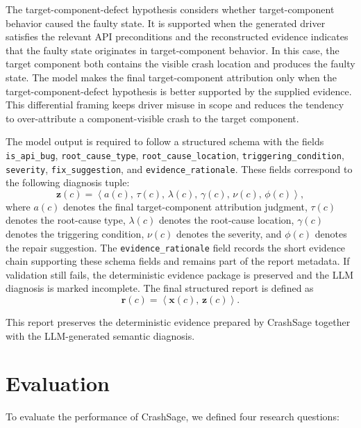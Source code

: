 \documentclass[pdflatex,sn-basic]{sn-jnl}%
\theoremstyle{thmstyleone}%
\theoremstyle{thmstyletwo}%
\theoremstyle{thmstylethree}%
\begin{document}
The target-component-defect hypothesis considers whether target-component behavior caused the faulty state. It is supported when the generated driver satisfies the relevant API preconditions and the reconstructed evidence indicates that the faulty state originates in target-component behavior. In this case, the target component both contains the visible crash location and produces the faulty state. The model makes the final target-component attribution only when the target-component-defect hypothesis is better supported by the supplied evidence. This differential framing keeps driver misuse in scope and reduces the tendency to over-attribute a component-visible crash to the target component.

The model output is required to follow a structured schema with the fields \texttt{is\_api\_bug}, \texttt{root\_cause\_type}, \texttt{root\_cause\_location}, \texttt{triggering\_condition}, \texttt{severity}, \texttt{fix\_suggestion}, and \texttt{evidence\_rationale}.
These fields correspond to the following diagnosis tuple:
\begin{equation*}
\mathbf{z}(c)=
\left\langle
a(c),\,\tau(c),\,\lambda(c),\,\gamma(c),\,\nu(c),\,\phi(c)
\right\rangle ,
\end{equation*}
where \(a(c)\) denotes the final target-component attribution judgment, \(\tau(c)\) denotes the root-cause type, \(\lambda(c)\) denotes the root-cause location, \(\gamma(c)\) denotes the triggering condition, \(\nu(c)\) denotes the severity, and \(\phi(c)\) denotes the repair suggestion.
The \texttt{evidence\_rationale} field records the short evidence chain supporting these schema fields and remains part of the report metadata.
If validation still fails, the deterministic evidence package is preserved and the LLM diagnosis is marked incomplete.
The final structured report is defined as
\begin{equation*}
\mathbf{r}(c)=
\left\langle
\mathbf{x}(c),\,\mathbf{z}(c)
\right\rangle .
\end{equation*}

This report preserves the deterministic evidence prepared by CrashSage together with the LLM-generated semantic diagnosis.


\section{Evaluation}
\label{sec:evaluation}

To evaluate the performance of CrashSage, we defined four research questions:
\end{document}
